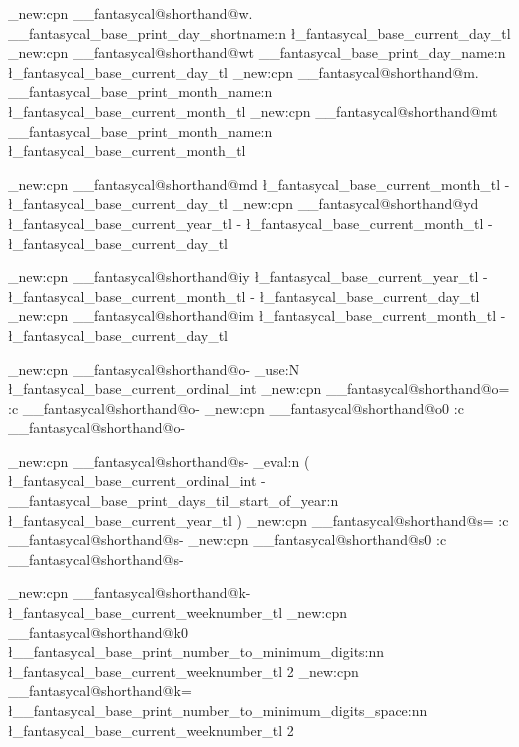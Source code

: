 \cs_new:cpn { __fantasycal@shorthand@w.}  
  { 
    \__fantasycal_base_print_day_shortname:n { \l_fantasycal_base_current_day_tl } 
  }
\cs_new:cpn { __fantasycal@shorthand@wt } 
  { 
    \__fantasycal_base_print_day_name:n { \l_fantasycal_base_current_day_tl } 
  }
\cs_new:cpn { __fantasycal@shorthand@m.}
  {
    \__fantasycal_base_print_month_name:n { \l_fantasycal_base_current_month_tl }
  }
\cs_new:cpn { __fantasycal@shorthand@mt }
  {
    \__fantasycal_base_print_month_name:n { \l_fantasycal_base_current_month_tl }
  }


%

\cs_new:cpn { __fantasycal@shorthand@md }
  {
    \l_fantasycal_base_current_month_tl - \l_fantasycal_base_current_day_tl
  }
\cs_new:cpn { __fantasycal@shorthand@yd }
  {
    \l_fantasycal_base_current_year_tl -
    \l_fantasycal_base_current_month_tl - \l_fantasycal_base_current_day_tl
  }

\cs_new:cpn { __fantasycal@shorthand@iy }
  {
    \l_fantasycal_base_current_year_tl -
    \l_fantasycal_base_current_month_tl - \l_fantasycal_base_current_day_tl
  }
\cs_new:cpn { __fantasycal@shorthand@im }
  {
    \l_fantasycal_base_current_month_tl - \l_fantasycal_base_current_day_tl
  }

\cs_new:cpn { __fantasycal@shorthand@o- } 
  { \int_use:N \l_fantasycal_base_current_ordinal_int }
\cs_new:cpn { __fantasycal@shorthand@o= } { \use:c { __fantasycal@shorthand@o- } }
\cs_new:cpn { __fantasycal@shorthand@o0 } { \use:c { __fantasycal@shorthand@o- } }

\cs_new:cpn { __fantasycal@shorthand@s- }
  {
    \int_eval:n 
      {(
        \l_fantasycal_base_current_ordinal_int
        - \__fantasycal_base_print_days_til_start_of_year:n { \l_fantasycal_base_current_year_tl }
      )}
  }
\cs_new:cpn { __fantasycal@shorthand@s= } { \use:c { __fantasycal@shorthand@s- } }
\cs_new:cpn { __fantasycal@shorthand@s0 } { \use:c { __fantasycal@shorthand@s- } }

\cs_new:cpn { __fantasycal@shorthand@k- } 
  { 
    \l_fantasycal_base_current_weeknumber_tl
  }
\cs_new:cpn { __fantasycal@shorthand@k0 } 
  { 
    \l__fantasycal_base_print_number_to_minimum_digits:nn 
      { \l_fantasycal_base_current_weeknumber_tl }
      { 2 }
  }
\cs_new:cpn { __fantasycal@shorthand@k= } 
  { 
    \l__fantasycal_base_print_number_to_minimum_digits_space:nn 
      { \l_fantasycal_base_current_weeknumber_tl }
      { 2 }
  }


